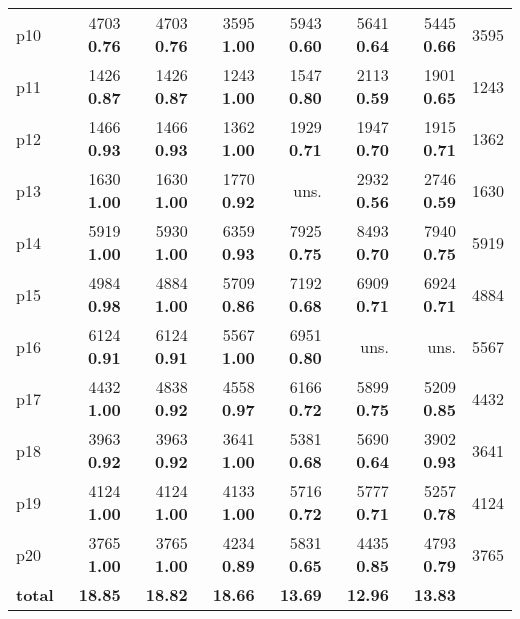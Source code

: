 \begin{tabular}{|l|rrrrrr|r|}
p10 & {\footnotesize 4703} \textbf{0.76} & {\footnotesize 4703} \textbf{0.76} & {\footnotesize 3595} \textbf{1.00} & {\footnotesize 5943} \textbf{0.60} & {\footnotesize 5641} \textbf{0.64} & {\footnotesize 5445} \textbf{0.66} & 3595\\
p11 & {\footnotesize 1426} \textbf{0.87} & {\footnotesize 1426} \textbf{0.87} & {\footnotesize 1243} \textbf{1.00} & {\footnotesize 1547} \textbf{0.80} & {\footnotesize 2113} \textbf{0.59} & {\footnotesize 1901} \textbf{0.65} & 1243\\
p12 & {\footnotesize 1466} \textbf{0.93} & {\footnotesize 1466} \textbf{0.93} & {\footnotesize 1362} \textbf{1.00} & {\footnotesize 1929} \textbf{0.71} & {\footnotesize 1947} \textbf{0.70} & {\footnotesize 1915} \textbf{0.71} & 1362\\
p13 & {\footnotesize 1630} \textbf{1.00} & {\footnotesize 1630} \textbf{1.00} & {\footnotesize 1770} \textbf{0.92} & uns. & {\footnotesize 2932} \textbf{0.56} & {\footnotesize 2746} \textbf{0.59} & 1630\\
p14 & {\footnotesize 5919} \textbf{1.00} & {\footnotesize 5930} \textbf{1.00} & {\footnotesize 6359} \textbf{0.93} & {\footnotesize 7925} \textbf{0.75} & {\footnotesize 8493} \textbf{0.70} & {\footnotesize 7940} \textbf{0.75} & 5919\\
p15 & {\footnotesize 4984} \textbf{0.98} & {\footnotesize 4884} \textbf{1.00} & {\footnotesize 5709} \textbf{0.86} & {\footnotesize 7192} \textbf{0.68} & {\footnotesize 6909} \textbf{0.71} & {\footnotesize 6924} \textbf{0.71} & 4884\\
p16 & {\footnotesize 6124} \textbf{0.91} & {\footnotesize 6124} \textbf{0.91} & {\footnotesize 5567} \textbf{1.00} & {\footnotesize 6951} \textbf{0.80} & uns. & uns. & 5567\\
p17 & {\footnotesize 4432} \textbf{1.00} & {\footnotesize 4838} \textbf{0.92} & {\footnotesize 4558} \textbf{0.97} & {\footnotesize 6166} \textbf{0.72} & {\footnotesize 5899} \textbf{0.75} & {\footnotesize 5209} \textbf{0.85} & 4432\\
p18 & {\footnotesize 3963} \textbf{0.92} & {\footnotesize 3963} \textbf{0.92} & {\footnotesize 3641} \textbf{1.00} & {\footnotesize 5381} \textbf{0.68} & {\footnotesize 5690} \textbf{0.64} & {\footnotesize 3902} \textbf{0.93} & 3641\\
p19 & {\footnotesize 4124} \textbf{1.00} & {\footnotesize 4124} \textbf{1.00} & {\footnotesize 4133} \textbf{1.00} & {\footnotesize 5716} \textbf{0.72} & {\footnotesize 5777} \textbf{0.71} & {\footnotesize 5257} \textbf{0.78} & 4124\\
p20 & {\footnotesize 3765} \textbf{1.00} & {\footnotesize 3765} \textbf{1.00} & {\footnotesize 4234} \textbf{0.89} & {\footnotesize 5831} \textbf{0.65} & {\footnotesize 4435} \textbf{0.85} & {\footnotesize 4793} \textbf{0.79} & 3765\\
\hline
\textbf{total} & \textbf{18.85} & \textbf{18.82} & \textbf{18.66} & \textbf{13.69} & \textbf{12.96} & \textbf{13.83} & \\
\hline
\end{tabular}

